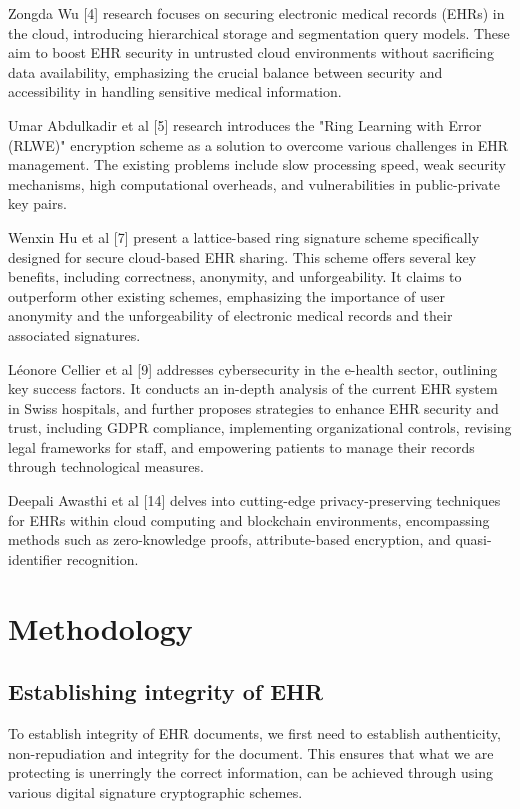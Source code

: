 \documentclass[runningheads]{llncs}
\begin{document}
Zongda Wu [4] research focuses on securing electronic medical records (EHRs) in the cloud, introducing hierarchical storage and segmentation query models. These aim to boost EHR security in untrusted cloud environments without sacrificing data availability, emphasizing the crucial balance between security and accessibility in handling sensitive medical information.

Umar Abdulkadir et al [5] research introduces the "Ring Learning with Error (RLWE)" encryption scheme as a solution to overcome various challenges in EHR management. The existing problems include slow processing speed, weak security mechanisms, high computational overheads, and vulnerabilities in public-private key pairs.

Wenxin Hu et al [7] present a lattice-based ring signature scheme specifically designed for secure cloud-based EHR sharing. This scheme offers several key benefits, including correctness, anonymity, and unforgeability. It claims to outperform other existing schemes, emphasizing the importance of user anonymity and the unforgeability of electronic medical records and their associated signatures. 

Léonore Cellier et al [9] addresses cybersecurity in the e-health sector, outlining key success factors. It conducts an in-depth analysis of the current EHR system in Swiss hospitals, and further proposes strategies to enhance EHR security and trust, including GDPR compliance, implementing organizational controls, revising legal frameworks for staff, and empowering patients to manage their records through technological measures. 

Deepali Awasthi et al [14] delves into cutting-edge privacy-preserving techniques for EHRs within cloud computing and blockchain environments, encompassing methods such as zero-knowledge proofs, attribute-based encryption, and quasi-identifier recognition. 
\section{Methodology}

\subsection{Establishing integrity of EHR}

To establish integrity of EHR documents, we first need to establish authenticity, non-repudiation and integrity for the document. This ensures that what we are protecting is unerringly the correct information, can be achieved through using various digital signature cryptographic schemes.
\end{document}
